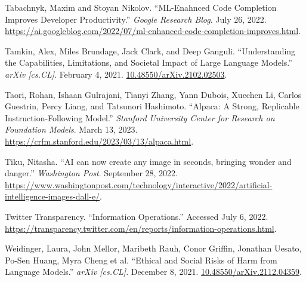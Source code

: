 \documentclass{article}
\begin{document}
\begin{thebibliography}{9}
  Tabachnyk, Maxim and Stoyan Nikolov. ``ML-Enahnced Code Completion Improves Developer Productivity.'' \textit{Google Research Blog}. July 26, 2022. \href{https://ai.googleblog.com/2022/07/ml-enhanced-code-completion-improves.html}{https://ai.googleblog.com/2022/07/ml-enhanced-code-completion-improves.html}. 

  Tamkin, Alex, Miles Brundage, Jack Clark, and Deep Ganguli. ``Understanding the Capabilities, Limitations, and Societal Impact of Large Language Models.'' \textit{arXiv [cs.CL]}. February 4, 2021. \href{https://doi.org/10.48550/arXiv.2102.02503}{10.48550/arXiv.2102.02503}.

  Taori, Rohan, Ishaan Gulrajani, Tianyi Zhang, Yann Dubois, Xuechen Li, Carlos Guestrin, Percy Liang, and Tatsunori Hashimoto. ``Alpaca: A Strong, Replicable Instruction-Following Model.'' \textit{Stanford University Center for Research on Foundation Models}. March 13, 2023. \href{https://crfm.stanford.edu/2023/03/13/alpaca.html}{https://crfm.stanford.edu/2023/03/13/alpaca.html}. 

  Tiku, Nitasha. ``AI can now create any image in seconds, bringing wonder and danger.'' \textit{Washington Post}. September 28, 2022. \href{https://www.washingtonpost.com/technology/interactive/2022/artificial-intelligence-images-dall-e/}{https://www.washingtonpost.com/technology/interactive/2022/artificial-intelligence-images-dall-e/}.

  Twitter Transparency. ``Information Operations.'' Accessed July 6, 2022. \href{https://transparency.twitter.com/en/reports/information-operations.html}{https://transparency.twitter.com/en/reports/information-operations.html}.

  Weidinger, Laura, John Mellor, Maribeth Rauh, Conor Griffin, Jonathan Uesato, Po-Sen Huang, Myra Cheng et al. ``Ethical and Social Risks of Harm from Language Models.'' \textit{arXiv [cs.CL]}. December 8, 2021. \href{https://arxiv.org/abs/2112.04359}{10.48550/arXiv.2112.04359}.
  
\end{thebibliography}
\end{document}
